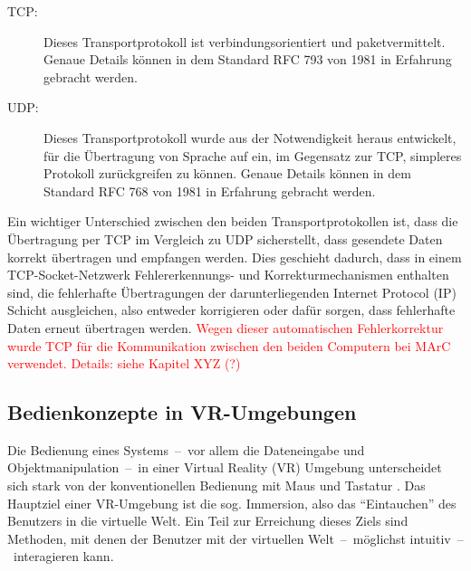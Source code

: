 \begin{description}
\item[TCP:] Dieses Transportprotokoll ist verbindungsorientiert und paketvermittelt. Genaue Details können in dem Standard RFC 793 \citep{rfc793} von 1981 in Erfahrung gebracht werden.

\item[UDP:] Dieses Transportprotokoll wurde aus der Notwendigkeit heraus entwickelt, für die Übertragung von Sprache auf ein, im Gegensatz zur TCP, simpleres Protokoll zurückgreifen zu können. Genaue Details können in dem Standard RFC 768 \citep{rfc768} von 1981 in Erfahrung gebracht werden.
\end{description}

Ein wichtiger Unterschied zwischen den beiden Transportprotokollen ist, dass die Übertragung per TCP im Vergleich zu UDP sicherstellt, dass gesendete Daten korrekt übertragen und empfangen werden. Dies geschieht dadurch, dass in einem TCP-Socket-Netzwerk Fehlererkennungs- und Korrekturmechanismen enthalten sind, die fehlerhafte Übertragungen der darunterliegenden Internet Protocol (IP) Schicht ausgleichen, also entweder korrigieren oder dafür sorgen, dass fehlerhafte Daten erneut übertragen werden. \textcolor{red}{Wegen dieser automatischen Fehlerkorrektur wurde TCP für die Kommunikation zwischen den beiden Computern bei MArC verwendet. Details: siehe Kapitel XYZ (?)}

\subsection{Bedienkonzepte in VR-Umgebungen}\label{sec:MenüAnwendungen}
Die Bedienung eines Systems~--~vor allem die Dateneingabe und Objektmanipulation~--~in einer Virtual Reality (VR) Umgebung unterscheidet sich stark von der konventionellen Bedienung mit Maus und Tastatur \cite{chu1997multi}. Das Hauptziel einer VR-Umgebung ist die sog. Immersion, also das "`Eintauchen"' des Benutzers in die virtuelle Welt. Ein Teil zur Erreichung dieses Ziels sind Methoden, mit denen der Benutzer mit der virtuellen Welt~--~möglichst intuitiv~--~interagieren kann.

